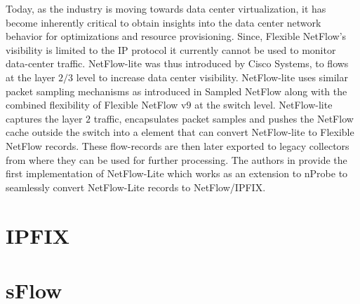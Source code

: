 Today, as the industry is moving towards data center virtualization, it has become inherently critical to obtain insights into the data center network behavior for optimizations and resource provisioning. Since, Flexible NetFlow's visibility is limited to the \ac{IP} protocol it currently cannot be used to monitor data-center traffic. NetFlow-lite was thus introduced by Cisco Systems, to flows at the layer $2/3$ level to increase data center visibility. NetFlow-lite  uses similar packet sampling mechanisms as introduced in Sampled NetFlow along with the combined flexibility of Flexible NetFlow v$9$ at the switch level. NetFlow-lite captures the layer $2$ traffic, encapsulates packet samples and pushes the NetFlow cache outside the switch into a element that can convert NetFlow-lite to Flexible NetFlow records. These flow-records are then later exported to legacy collectors from where they can be used for further processing. The authors in \cite{lderi:2011} provide the first implementation of NetFlow-Lite which works as an extension to nProbe \cite{lderi:2003} to seamlessly convert NetFlow-Lite records to NetFlow/\ac{IPFIX}.




\section{IPFIX}\label{sec:ipfix}
\section{sFlow}\label{sec:sflow}